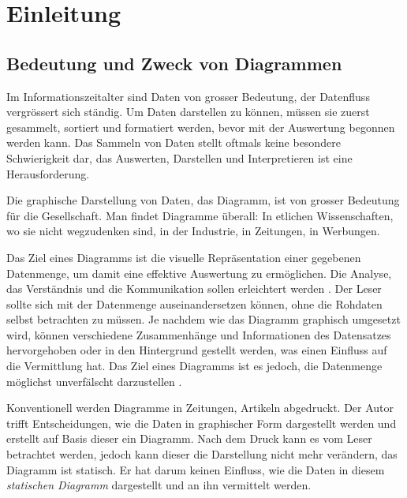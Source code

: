 \chapter{Einleitung}

\section{Bedeutung  und Zweck von Diagrammen}

Im Informationszeitalter sind Daten von grosser Bedeutung, der Datenfluss vergrössert sich ständig. Um Daten darstellen zu können, müssen sie zuerst gesammelt, sortiert und formatiert werden, bevor mit der Auswertung begonnen werden kann. Das Sammeln von Daten stellt oftmals keine besondere Schwierigkeit dar, das Auswerten, Darstellen und Interpretieren ist eine Herausforderung.

Die graphische Darstellung von Daten, das Diagramm, ist von grosser Bedeutung für die Gesellschaft. Man findet Diagramme überall: In etlichen Wissenschaften, wo sie nicht wegzudenken sind, in der Industrie, in Zeitungen, in Werbungen.


Das Ziel eines Diagramms ist die visuelle Repräsentation einer gegebenen Datenmenge, um damit eine effektive Auswertung zu ermöglichen. Die Analyse, das Verständnis und die Kommunikation sollen erleichtert werden \cite{viz}. Der Leser sollte sich mit der Datenmenge auseinandersetzen können, ohne die Rohdaten selbst betrachten zu müssen. Je nachdem wie das Diagramm graphisch umgesetzt wird, können verschiedene Zusammenhänge und Informationen des Datensatzes hervorgehoben oder in den Hintergrund gestellt werden, was einen Einfluss auf die Vermittlung hat. 
Das Ziel eines Diagramms ist es jedoch, die Datenmenge möglichst unverfälscht darzustellen \cite{viz}. 




Konventionell werden Diagramme in Zeitungen, Artikeln abgedruckt. Der Autor trifft Entscheidungen, wie die Daten in graphischer Form dargestellt werden und erstellt auf Basis dieser ein Diagramm. Nach dem Druck kann es vom Leser betrachtet werden, jedoch kann dieser die Darstellung nicht mehr verändern, das Diagramm ist statisch. Er hat darum keinen Einfluss, wie die Daten in diesem \textit{statischen Diagramm} dargestellt und an ihn vermittelt werden.

